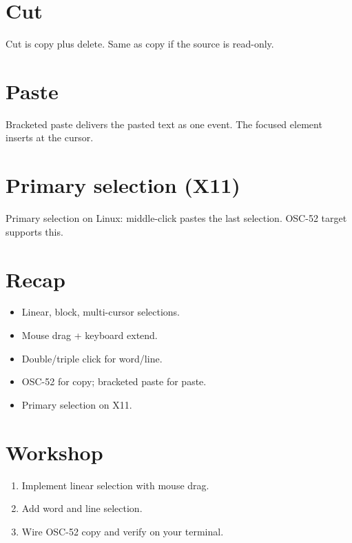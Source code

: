 \section{Cut}

Cut is copy plus delete. Same as copy if the source is
read-only.

\section{Paste}

Bracketed paste delivers the pasted text as one event. The
focused element inserts at the cursor.

\section{Primary selection (X11)}

Primary selection on Linux: middle-click pastes the last
selection. OSC-52  target supports this.

\section{Recap}

\begin{recap}
\begin{itemize}[leftmargin=*]
  \item Linear, block, multi-cursor selections.
  \item Mouse drag + keyboard extend.
  \item Double/triple click for word/line.
  \item OSC-52 for copy; bracketed paste for paste.
  \item Primary selection on X11.
\end{itemize}
\end{recap}

\section*{Workshop}

\begin{enumerate}[leftmargin=*]
  \item Implement linear selection with mouse drag.
  \item Add word and line selection.
  \item Wire OSC-52 copy and verify on your terminal.
\end{enumerate}
